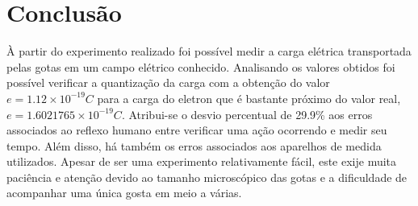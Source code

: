\section{Conclusão}
À partir do experimento realizado foi possível medir a carga elétrica transportada pelas gotas em um campo elétrico conhecido. Analisando os valores obtidos foi possível verificar a quantização da carga com a obtenção do valor $e=1.12\times 10^{-19}C$ para a carga do eletron que é bastante próximo do valor real, $e=1.6021765 \times 10^{-19}C$.
Atribui-se o desvio percentual de 29.9\% aos erros associados ao reflexo humano entre verificar uma ação ocorrendo e medir seu tempo. Além disso, há também os erros associados aos aparelhos de medida utilizados.
Apesar de ser uma experimento relativamente fácil, este exije muita paciência e atenção devido ao tamanho microscópico das gotas e a dificuldade de acompanhar uma única gosta em meio a várias.
